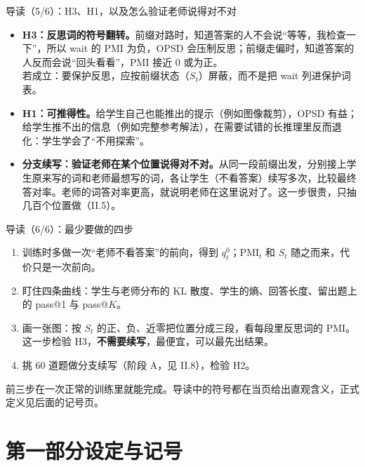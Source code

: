 \documentclass[aspectratio=169,11pt]{beamer}
\newcommand{\gnote}[1]{{\scriptsize\color{cGray}#1}}
\begin{document}
\begin{frame}{导读（5/6）：H3、H1，以及怎么验证老师说得对不对}
\small
\begin{itemize}
  \setlength\itemsep{5pt}
  \item \textbf{H3：反思词的符号翻转。}前缀对路时，知道答案的人不会说“等等，我检查一下”，所以 wait 的 $\mathrm{PMI}$ 为负，OPSD 会压制反思；前缀走偏时，知道答案的人反而会说“回头看看”，$\mathrm{PMI}$ 接近 0 或为正。\\
  若成立：要保护反思，应按前缀状态（$S_t$）屏蔽，而不是把 wait 列进保护词表。
  \item \textbf{H1：可推得性。}给学生自己也能推出的提示（例如图像裁剪），OPSD 有益；给学生推不出的信息（例如完整参考解法），在需要试错的长推理里反而退化：学生学会了“不用探索”。
  \item \textbf{分支续写：验证老师在某个位置说得对不对。}从同一段前缀出发，分别接上学生原来写的词和老师最想写的词，各让学生（不看答案）续写多次，比较最终答对率。老师的词答对率更高，就说明老师在这里说对了。这一步很贵，只抽几百个位置做（II.5）。
\end{itemize}
\end{frame}

\begin{frame}{导读（6/6）：最少要做的四步}
\begin{enumerate}
  \setlength\itemsep{8pt}
  \item 训练时多做一次“老师不看答案”的前向，得到 $q^0_t$；$\mathrm{PMI}_t$ 和 $S_t$ 随之而来，代价只是一次前向。
  \item 盯住四条曲线：学生与老师分布的 KL 散度、学生的熵、回答长度、留出题上的 pass@1 与 pass@$K$。
  \item 画一张图：按 $S_t$ 的正、负、近零把位置分成三段，看每段里反思词的 $\mathrm{PMI}$。这一步检验 H3，\textbf{不需要续写}，最便宜，可以最先出结果。
  \item 挑 60 道题做分支续写（阶段 A，见 II.8），检验 H2。
\end{enumerate}
\vspace{6pt}
\gnote{前三步在一次正常的训练里就能完成。导读中的符号都在当页给出直观含义，正式定义见后面的记号页。}
\end{frame}

\section{第一部分\quad 设定与记号}
\end{document}
